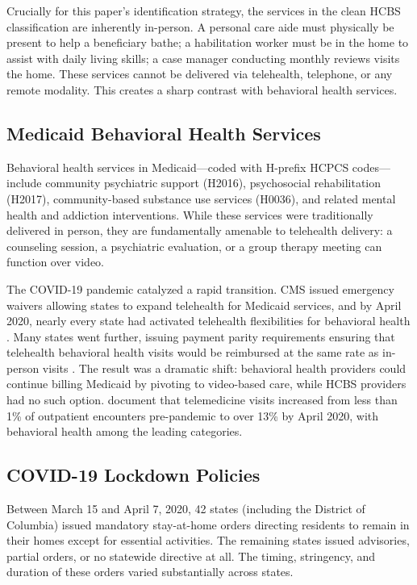 \documentclass[12pt]{article}
\begin{document}
Crucially for this paper's identification strategy, the services in the clean HCBS classification are inherently in-person. A personal care aide must physically be present to help a beneficiary bathe; a habilitation worker must be in the home to assist with daily living skills; a case manager conducting monthly reviews visits the home. These services cannot be delivered via telehealth, telephone, or any remote modality. This creates a sharp contrast with behavioral health services.

\subsection{Medicaid Behavioral Health Services}

Behavioral health services in Medicaid---coded with H-prefix HCPCS codes---include community psychiatric support (H2016), psychosocial rehabilitation (H2017), community-based substance use services (H0036), and related mental health and addiction interventions. While these services were traditionally delivered in person, they are fundamentally amenable to telehealth delivery: a counseling session, a psychiatric evaluation, or a group therapy meeting can function over video.

The COVID-19 pandemic catalyzed a rapid transition. CMS issued emergency waivers allowing states to expand telehealth for Medicaid services, and by April 2020, nearly every state had activated telehealth flexibilities for behavioral health \citep{cms2020telehealth}. Many states went further, issuing payment parity requirements ensuring that telehealth behavioral health visits would be reimbursed at the same rate as in-person visits \citep{ncsl2021telehealth}. The result was a dramatic shift: behavioral health providers could continue billing Medicaid by pivoting to video-based care, while HCBS providers had no such option. \citet{patel2021telehealth} document that telemedicine visits increased from less than 1\% of outpatient encounters pre-pandemic to over 13\% by April 2020, with behavioral health among the leading categories.

\subsection{COVID-19 Lockdown Policies}

Between March 15 and April 7, 2020, 42 states (including the District of Columbia) issued mandatory stay-at-home orders directing residents to remain in their homes except for essential activities. The remaining states issued advisories, partial orders, or no statewide directive at all. The timing, stringency, and duration of these orders varied substantially across states.
\end{document}
